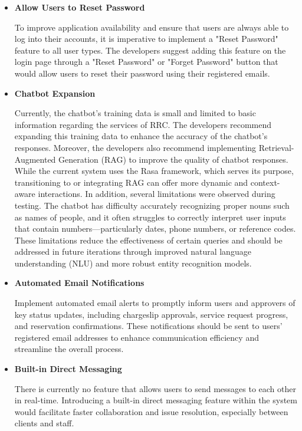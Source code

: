 \begin{itemize}
	
	\item \textbf{Allow Users to Reset Password}
	
	To improve application availability and ensure that users are always able to log into their accounts, it is imperative to implement a "Reset Password" feature to all user types. The developers suggest adding this feature on the login page through a "Reset Password" or "Forget Password" button that would allow users to reset their password using their registered emails.
	
	\item \textbf{Chatbot Expansion}
	
	Currently, the chatbot's training data is small and limited to basic information regarding the services of RRC. The developers recommend expanding this training data to enhance the accuracy of the chatbot's responses. Moreover, the developers also recommend implementing Retrieval-Augmented Generation (RAG) to improve the quality of chatbot responses. While the current system uses the Rasa framework, which serves its purpose, transitioning to or integrating RAG can offer more dynamic and context-aware interactions. In addition, several limitations were observed during testing. The chatbot has difficulty accurately recognizing proper nouns such as names of people, and it often struggles to correctly interpret user inputs that contain numbers—particularly dates, phone numbers, or reference codes. These limitations reduce the effectiveness of certain queries and should be addressed in future iterations through improved natural language understanding (NLU) and more robust entity recognition models.
	
	\item \textbf{Automated Email Notifications}
	
	Implement automated email alerts to promptly inform users and approvers of key status updates, including chargeslip approvals, service request progress, and reservation confirmations. These notifications should be sent to users' registered email addresses to enhance communication efficiency and streamline the overall process.
	
	\item \textbf{Built-in Direct Messaging}
	
	There is currently no feature that allows users to send messages to each other in real-time. Introducing a built-in direct messaging feature within the system would facilitate faster collaboration and issue resolution, especially between clients and staff.
	

\end{itemize}
